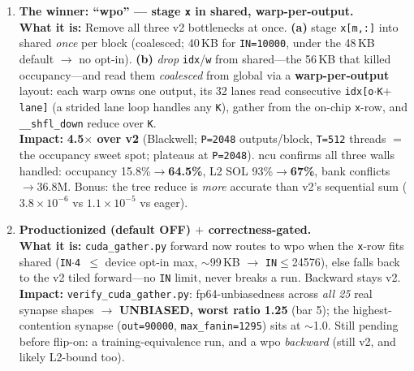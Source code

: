 \documentclass[11pt]{article}
\newcommand{\what}[1]{\textbf{What it is:} #1}
\newcommand{\impact}[1]{\textbf{Impact:} #1}
\begin{document}
\begin{enumerate}[leftmargin=*, resume]
\item \textbf{The winner: ``wpo'' --- stage \texttt{x} in shared, warp-per-output.}\\
\what{Remove all three v2 bottlenecks at once. \textbf{(a)} stage \texttt{x[m,:]} into shared
\emph{once} per block (coalesced; 40\,KB for \texttt{IN=10000}, under the 48\,KB default $\to$ no
opt-in). \textbf{(b)} \emph{drop} \texttt{idx}/\texttt{w} from shared---the 56\,KB that killed
occupancy---and read them \emph{coalesced} from global via a \textbf{warp-per-output} layout: each
warp owns one output, its 32 lanes read consecutive \texttt{idx[o$\cdot$K$+$lane]} (a strided lane
loop handles any \texttt{K}), gather from the on-chip \texttt{x}-row, and \texttt{\_\_shfl\_down}
reduce over \texttt{K}.}\\
\impact{\textbf{4.5$\times$ over v2} (Blackwell; \texttt{P=2048} outputs/block, \texttt{T=512}
threads $=$ the occupancy sweet spot; plateaus at \texttt{P=2048}). ncu confirms all three walls
handled: occupancy 15.8\%$\to$\textbf{64.5\%}, L2 SOL 93\%$\to$\textbf{67\%}, bank conflicts
$\to$36.8M. Bonus: the tree reduce is \emph{more} accurate than v2's sequential sum
($3.8\times10^{-6}$ vs $1.1\times10^{-5}$ vs eager).}

\item \textbf{Productionized (default OFF) $+$ correctness-gated.}\\
\what{\texttt{cuda\_gather.py} forward now routes to wpo when the \texttt{x}-row fits shared
(\texttt{IN$\cdot$4 $\le$} device opt-in max, $\sim$99\,KB $\to$ \texttt{IN}$\le$24576), else
falls back to the v2 tiled forward---no \texttt{IN} limit, never breaks a run. Backward stays v2.}\\
\impact{\texttt{verify\_cuda\_gather.py}: fp64-unbiasedness across \emph{all 25} real synapse shapes
$\to$ \textbf{UNBIASED, worst ratio 1.25} (bar 5); the highest-contention synapse
(\texttt{out=90000}, \texttt{max\_fanin=1295}) sits at $\sim$1.0. Still pending before flip-on: a
training-equivalence run, and a wpo \emph{backward} (still v2, and likely L2-bound too).}

\end{enumerate}
\end{document}
